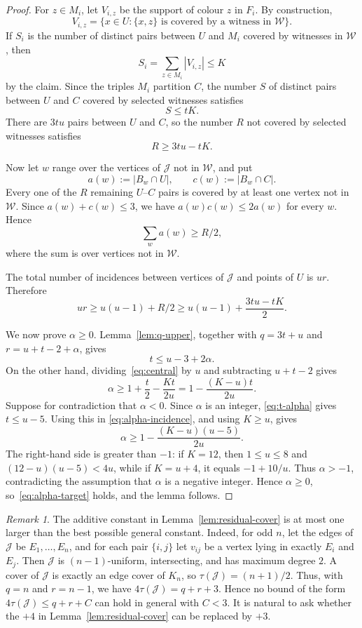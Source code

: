 \documentclass[11pt]{amsart}
\theoremstyle{remark}
\newtheorem*{remark}{Remark}
\newcommand{\cJ}{\mathcal J}
\newcommand{\ta}{\tau}
\begin{document}
\begin{proof}
For $z\in M_i$, let $V_{i,z}$ be the support of colour $z$ in $F_i$.  By
construction,
\[
  V_{i,z}
  =
  \{x\in U:\{x,z\}\text{ is covered by a witness in }\mathcal W\}.
\]
If $S_i$ is the number of distinct pairs between $U$ and $M_i$ covered by
witnesses in $\mathcal W$, then
\[
  S_i=\sum_{z\in M_i}|V_{i,z}|\le K
\]
by the claim.  Since the triples $M_i$ partition $C$, the number $S$ of
distinct pairs between $U$ and $C$ covered by selected witnesses satisfies
\[
  S\le tK.
\]
There are $3tu$ pairs between $U$ and $C$, so the number $R$ not covered by
selected witnesses satisfies
\[
  R\ge 3tu-tK.
\]

Now let $w$ range over the vertices of $\cJ$ not in $\mathcal W$, and put
\[
  a(w):=|B_w\cap U|,\qquad c(w):=|B_w\cap C|.
\]
Every one of the $R$ remaining $U$--$C$ pairs is covered by at least one
vertex not in $\mathcal W$.  Since $a(w)+c(w)\le 3$, we have
$a(w)c(w)\le 2a(w)$ for every $w$.  Hence
\[
  \sum_w a(w)\ge R/2,
\]
where the sum is over vertices not in $\mathcal W$.

The total number of incidences between vertices of $\cJ$ and points of $U$ is
$ur$.  Therefore
\begin{equation}\label{eq:central}
  ur\ge u(u-1)+R/2\ge u(u-1)+\frac{3tu-tK}{2}.
\end{equation}

We now prove $\alpha\ge 0$.  Lemma~\ref{lem:q-upper}, together with
$q=3t+u$ and $r=u+t-2+\alpha$, gives
\begin{equation}\label{eq:t-alpha}
  t\le u-3+2\alpha.
\end{equation}
On the other hand, dividing~\eqref{eq:central} by $u$ and subtracting
$u+t-2$ gives
\begin{equation}\label{eq:alpha-incidence}
  \alpha\ge 1+\frac t2-\frac{Kt}{2u}
  =1-\frac{(K-u)t}{2u}.
\end{equation}
Suppose for contradiction that $\alpha<0$.  Since $\alpha$ is an integer,
\eqref{eq:t-alpha} gives $t\le u-5$.  Using this in
\eqref{eq:alpha-incidence}, and using $K\ge u$, gives
\[
  \alpha\ge 1-\frac{(K-u)(u-5)}{2u}.
\]
The right-hand side is greater than $-1$: if $K=12$, then $1\le u\le 8$ and
$(12-u)(u-5)<4u$, while if $K=u+4$, it equals $-1+10/u$.  Thus
$\alpha>-1$, contradicting the assumption that $\alpha$ is a negative
integer.  Hence $\alpha\ge0$, so~\eqref{eq:alpha-target} holds, and the
lemma follows.
\end{proof}

\begin{remark}
The additive constant in Lemma~\ref{lem:residual-cover} is at most one larger
than the best possible general constant.  Indeed, for odd $n$, let the edges
of $\cJ$ be
$E_1,\ldots,E_n$, and for each pair $\{i,j\}$ let $v_{ij}$ be a vertex lying
in exactly $E_i$ and $E_j$.  Then $\cJ$ is $(n-1)$-uniform, intersecting, and
has maximum degree $2$.  A cover of $\cJ$ is exactly an edge cover of $K_n$,
so $\ta(\cJ)=(n+1)/2$.  Thus, with $q=n$ and $r=n-1$, we have
$4\ta(\cJ)=q+r+3$.  Hence no bound of the form
$4\ta(\cJ)\le q+r+C$ can hold in general with $C<3$.  It is natural to ask
whether the $+4$ in Lemma~\ref{lem:residual-cover} can be replaced by $+3$.
\end{remark}
\end{document}
